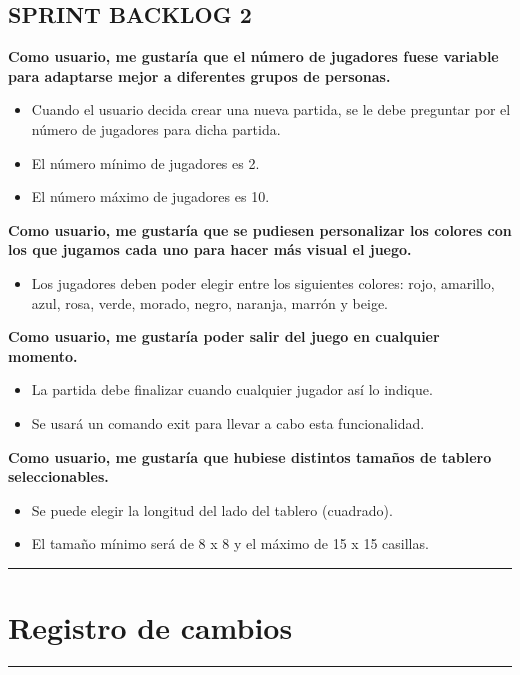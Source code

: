 \documentclass{article}
\begin{document}
\subsection{SPRINT BACKLOG 2}\label{sprint-backlog-2}

\textbf{Como usuario, me gustaría que el número de jugadores fuese
variable para adaptarse mejor a diferentes grupos de personas.}

\begin{itemize}
\item
  Cuando el usuario decida crear una nueva partida, se le debe preguntar
  por el número de jugadores para dicha partida.
\item
  El número mínimo de jugadores es 2.
\item
  El número máximo de jugadores es 10.
\end{itemize}

\textbf{Como usuario, me gustaría que se pudiesen personalizar los
colores con los que jugamos cada uno para hacer más visual el juego.}

\begin{itemize}

\item
  Los jugadores deben poder elegir entre los siguientes colores: rojo,
  amarillo, azul, rosa, verde, morado, negro, naranja, marrón y beige.
\end{itemize}

\textbf{Como usuario, me gustaría poder salir del juego en cualquier
momento.}

\begin{itemize}
\item
  La partida debe finalizar cuando cualquier jugador así lo indique.
\item
  Se usará un comando exit para llevar a cabo esta funcionalidad.
\end{itemize}

\textbf{Como usuario, me gustaría que hubiese distintos tamaños de
tablero seleccionables.}

\begin{itemize}
\item
  Se puede elegir la longitud del lado del tablero (cuadrado).
\item
  El tamaño mínimo será de 8 x 8 y el máximo de 15 x 15 casillas.
\end{itemize}

\begin{center}\rule{0.5\linewidth}{0.5pt}\end{center}

\section{Registro de cambios}\label{registro-de-cambios}

\begin{center}\rule{0.5\linewidth}{0.5pt}\end{center}
\end{document}
